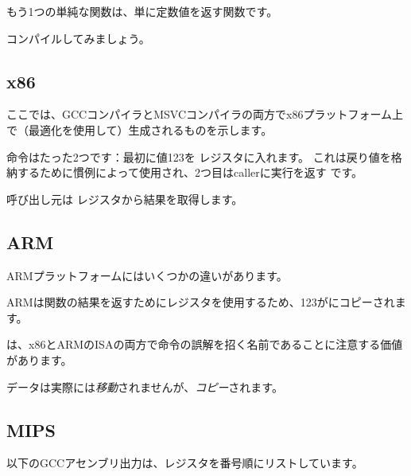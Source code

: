 \label{ret_val_func}

もう1つの単純な関数は、単に定数値を返す関数です。



コンパイルしてみましょう。

\subsection{x86}

ここでは、GCCコンパイラとMSVCコンパイラの両方でx86プラットフォーム上で（最適化を使用して）生成されるものを示します。



命令はたった2つです：最初に値123を \EAX レジスタに入れます。
これは戻り値を格納するために慣例によって使用され、2つ目は\gls{caller}に実行を返す \RET です。

呼び出し元は \EAX レジスタから結果を取得します。

\subsection{ARM}

ARMプラットフォームにはいくつかの違いがあります。



ARMは関数の結果を返すためにレジスタを使用するため、123がにコピーされます。

\MOV は、x86とARMの\ac{ISA}の両方で命令の誤解を招く名前であることに注意する価値があります。 

データは実際には\emph{移動}されませんが、\emph{コピー}されます。

\subsection{MIPS}

\label{MIPS_leaf_function_ex1}

以下のGCCアセンブリ出力は、レジスタを番号順にリストしています。



